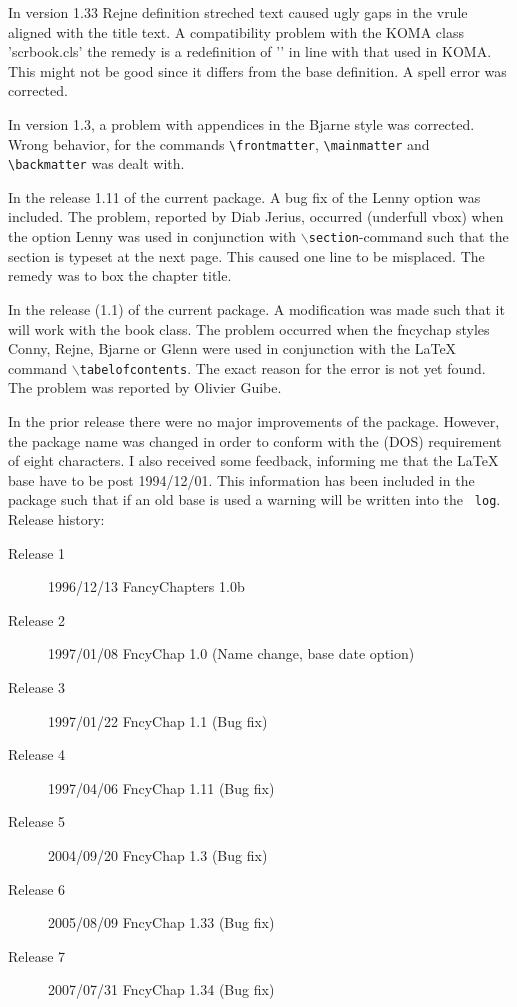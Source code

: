\documentclass{report}
\newcommand{\A}[1]{{$\backslash${\tt #1}}}
\begin{document}
    \tradini
     In version 1.33 Rejne definition streched text caused ugly gaps
     in the vrule aligned with the title text. A compatibility problem
     with the KOMA class 'scrbook.cls' the remedy is a redefinition of
     '\@schapter' in line with that used in KOMA. This might not be
     good since it differs from the base definition. A spell error was
     corrected.
 
      In version 1.3, a problem with appendices in the Bjarne style was
      corrected. Wrong behavior, for the commands
      \verb+\frontmatter+, \verb+\mainmatter+ and  \verb+\backmatter+
      was dealt with. 

      In the release 1.11 of the current package. A bug
      fix of the Lenny option was included. The problem, reported
      by Diab Jerius, occurred (underfull vbox) when the option Lenny
      was used in conjunction with \A{section}-command such that the
      section is typeset at the next page. This caused one line to be
      misplaced. The remedy was to box the chapter title.

      In the release (1.1) of the current package. A
      modification was made such that it will work with the book
      class. The problem occurred when the fncychap styles Conny,
      Rejne, Bjarne or Glenn were used in conjunction with the
      \LaTeX{} command \A{tabelofcontents}. The exact reason for the
      error is not yet found. The problem was reported by Olivier Guibe.

      In the prior release there were no major improvements of the
      package. However, the package name was changed in order to
      conform with the (DOS) requirement of eight characters. I also
      received some feedback, informing me that the \LaTeX{} base have
      to be post 1994/12/01.  This information has been included in
      the package such that if an old base is used a warning will be
      written into the {\tt
        log}.\\
      Release history:
      \begin{description}
        \item[Release 1] 1996/12/13 FancyChapters 1.0b
        \item[Release 2] 1997/01/08 FncyChap 1.0 (Name change, base
          date option)
        \item[Release 3] 1997/01/22 FncyChap 1.1 (Bug fix)
        \item[Release 4] 1997/04/06 FncyChap 1.11 (Bug fix)
        \item[Release 5] 2004/09/20 FncyChap 1.3 (Bug fix)
        \item[Release 6] 2005/08/09 FncyChap 1.33 (Bug fix)
        \item[Release 7] 2007/07/31 FncyChap 1.34 (Bug fix)
      \end{description}
\end{document}
